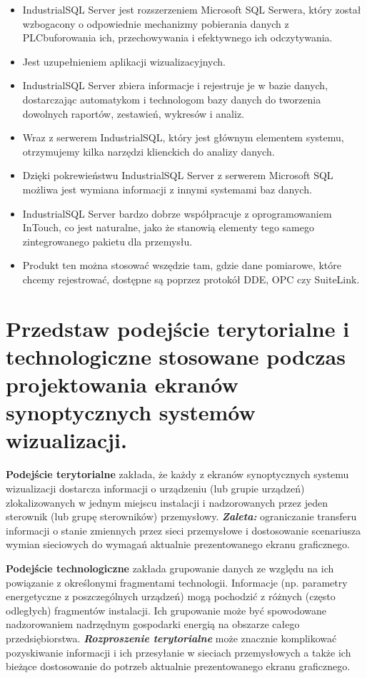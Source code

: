 \documentclass{article}
\begin{document}
	\begin{itemize}
		\item IndustrialSQL Server jest rozszerzeniem Microsoft SQL Serwera, który został wzbogacony o odpowiednie mechanizmy pobierania danych z PLCbuforowania ich, przechowywania i efektywnego ich odczytywania.
	
		\item Jest uzupełnieniem aplikacji wizualizacyjnych.
	
		\item IndustrialSQL Server zbiera informacje i rejestruje je w bazie danych, dostarczając automatykom i technologom bazy danych do tworzenia dowolnych raportów, zestawień, wykresów i analiz.
	
		\item Wraz z serwerem IndustrialSQL, który jest głównym elementem systemu, otrzymujemy kilka narzędzi klienckich do analizy danych.
	
		\item Dzięki pokrewieństwu IndustrialSQL Server z serwerem Microsoft SQL możliwa jest wymiana informacji z innymi systemami baz danych.
	
		\item IndustrialSQL Server bardzo dobrze współpracuje z oprogramowaniem InTouch, co jest naturalne, jako że stanowią elementy tego samego zintegrowanego pakietu dla przemysłu.
	
		\item Produkt ten można stosować wszędzie tam, gdzie dane pomiarowe, które chcemy rejestrować, dostępne są poprzez protokół DDE, OPC czy SuiteLink.
	\end{itemize}
	
	\section{Przedstaw podejście terytorialne i technologiczne stosowane podczas projektowania	ekranów synoptycznych systemów wizualizacji.}
	\textbf{Podejście terytorialne} zakłada, że każdy z ekranów
	synoptycznych systemu wizualizacji dostarcza informacji o
	urządzeniu (lub grupie urządzeń) zlokalizowanych w jednym miejscu
	instalacji i nadzorowanych przez jeden sterownik (lub grupę
	sterowników) przemysłowy.
	\textit{\textbf{Zaleta:}} ograniczanie transferu informacji o stanie zmiennych przez
	sieci przemysłowe i dostosowanie scenariusza wymian sieciowych do
	wymagań aktualnie prezentowanego ekranu graficznego.
	
	
	\textbf{Podejście technologiczne }zakłada grupowanie danych ze względu na
	ich powiązanie z określonymi fragmentami technologii. Informacje (np.
	parametry energetyczne z poszczególnych urządzeń) mogą pochodzić z
	różnych (często odległych) fragmentów instalacji. Ich grupowanie może być
	spowodowane nadzorowaniem nadrzędnym gospodarki energią na obszarze
	całego przedsiębiorstwa.
	\textbf{\textit{Rozproszenie terytorialne }}może znacznie komplikować pozyskiwanie
	informacji i ich przesyłanie w sieciach przemysłowych a także ich bieżące
	dostosowanie do potrzeb aktualnie prezentowanego ekranu graficznego.
	
\end{document}
